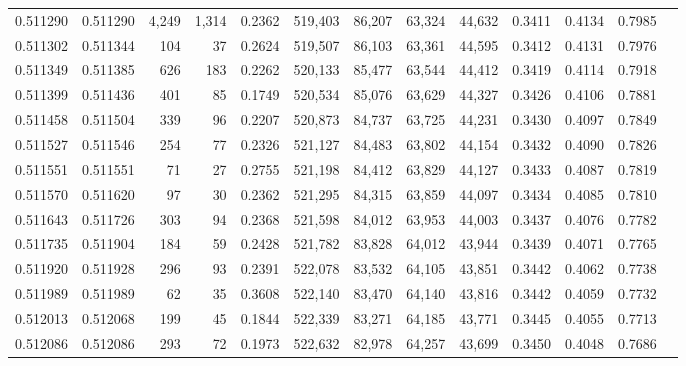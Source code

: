 \begin{tabular}{rrrrrrrrrrrrr}
0.511290 & 0.511290 & 4,249 & 1,314 &                                     0.2362 & 519,403 &  86,207 &  63,324 &  44,632 & 0.3411 & 0.4134 & 0.7985 \\
0.511302 & 0.511344 &   104 &    37 &                                     0.2624 & 519,507 &  86,103 &  63,361 &  44,595 & 0.3412 & 0.4131 & 0.7976 \\
0.511349 & 0.511385 &   626 &   183 &                                     0.2262 & 520,133 &  85,477 &  63,544 &  44,412 & 0.3419 & 0.4114 & 0.7918 \\
0.511399 & 0.511436 &   401 &    85 &                                     0.1749 & 520,534 &  85,076 &  63,629 &  44,327 & 0.3426 & 0.4106 & 0.7881 \\
0.511458 & 0.511504 &   339 &    96 &                                     0.2207 & 520,873 &  84,737 &  63,725 &  44,231 & 0.3430 & 0.4097 & 0.7849 \\
0.511527 & 0.511546 &   254 &    77 &                                     0.2326 & 521,127 &  84,483 &  63,802 &  44,154 & 0.3432 & 0.4090 & 0.7826 \\
0.511551 & 0.511551 &    71 &    27 &                                     0.2755 & 521,198 &  84,412 &  63,829 &  44,127 & 0.3433 & 0.4087 & 0.7819 \\
0.511570 & 0.511620 &    97 &    30 &                                     0.2362 & 521,295 &  84,315 &  63,859 &  44,097 & 0.3434 & 0.4085 & 0.7810 \\
0.511643 & 0.511726 &   303 &    94 &                                     0.2368 & 521,598 &  84,012 &  63,953 &  44,003 & 0.3437 & 0.4076 & 0.7782 \\
0.511735 & 0.511904 &   184 &    59 &                                     0.2428 & 521,782 &  83,828 &  64,012 &  43,944 & 0.3439 & 0.4071 & 0.7765 \\
0.511920 & 0.511928 &   296 &    93 &                                     0.2391 & 522,078 &  83,532 &  64,105 &  43,851 & 0.3442 & 0.4062 & 0.7738 \\
0.511989 & 0.511989 &    62 &    35 &                                     0.3608 & 522,140 &  83,470 &  64,140 &  43,816 & 0.3442 & 0.4059 & 0.7732 \\
0.512013 & 0.512068 &   199 &    45 &                                     0.1844 & 522,339 &  83,271 &  64,185 &  43,771 & 0.3445 & 0.4055 & 0.7713 \\
0.512086 & 0.512086 &   293 &    72 &                                     0.1973 & 522,632 &  82,978 &  64,257 &  43,699 & 0.3450 & 0.4048 & 0.7686 \\

\end{tabular}
